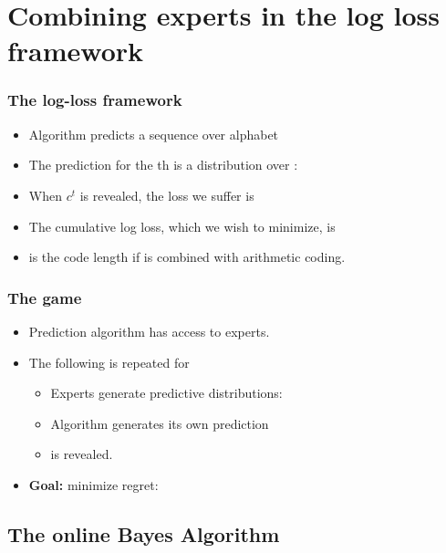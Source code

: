\documentclass{beamer}
\begin{document}
\section{Combining experts in the log loss framework}

\begin{frame}
\frametitle{The log-loss framework}
\begin{itemize}
\item Algorithm  predicts a sequence 
over alphabet 
\item The prediction for the th is a distribution over \R{$\Sigma$}:\\
\item When $c^t$ is revealed, the loss we suffer is 
\item The {\color{blue}cumulative log loss}, which we wish to minimize, 
is 
\item {} is the code length if  is combined with arithmetic coding.
\end{itemize}
\end{frame}

\begin{frame}
\frametitle{The game}
\begin{itemize}
\item Prediction algorithm  has access to  experts.
\item The following is repeated for 
\begin{itemize}
\item Experts generate predictive distributions: 
\item Algorithm generates its own prediction 
\item {} is revealed.
\end{itemize}
\item {\bf Goal:} minimize regret:
\R{\[
-\sum_{t=1}^T \log p_A^t(c^t) + \min_{i=1,\dots,N} \paren{-\sum_{t=1}^T \log p_i^t(c^t)} 
\]}
\end{itemize}
\end{frame}

\subsection{The online Bayes Algorithm}
\end{document}
